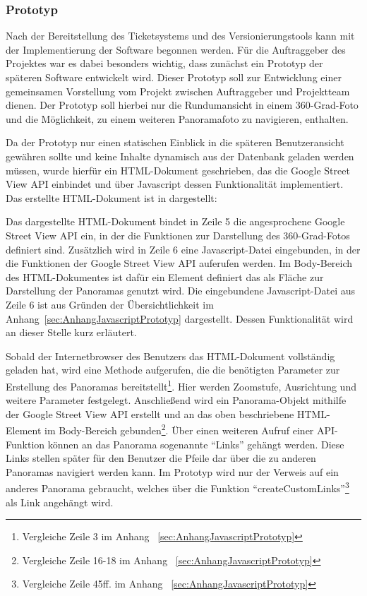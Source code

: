 \subsubsection{Prototyp}
\label{sec:Prototyp}

Nach der Bereitstellung des Ticketsystems und des Versionierungstools kann mit
der Implementierung der Software begonnen werden. Für die Auftraggeber des
Projektes war es dabei besonders wichtig, dass zunächst ein Prototyp der
späteren Software entwickelt wird. Dieser Prototyp soll zur Entwicklung einer
gemeinsamen Vorstellung vom Projekt zwischen Auftraggeber und Projektteam
dienen. Der Prototyp soll hierbei nur die Rundumansicht in einem
360-Grad-Foto und die Möglichkeit, zu einem weiteren Panoramafoto zu navigieren,
enthalten.

Da der Prototyp nur einen statischen Einblick in die späteren Benutzeransicht
gewähren sollte und keine Inhalte dynamisch aus der Datenbank geladen werden
müssen, wurde hierfür ein HTML-Dokument geschrieben, das die Google Street View
API einbindet und über Javascript dessen Funktionalität implementiert. Das
erstellte HTML-Dokument ist in  dargestellt:



Das dargestellte HTML-Dokument bindet in Zeile 5 die angesprochene Google
Street View API ein, in der die Funktionen zur Darstellung des 360-Grad-Fotos
definiert sind. Zusätzlich wird in Zeile 6 eine Javascript-Datei eingebunden,
in der die Funktionen der Google Street View API auferufen werden. Im
Body-Bereich des HTML-Dokumentes ist dafür ein Element definiert das als Fläche
zur Darstellung der Panoramas genutzt wird. Die eingebundene Javascript-Datei
aus Zeile 6 ist aus Gründen der Übersichtlichkeit
im Anhang~\ref{sec:AnhangJavascriptPrototyp} dargestellt. Dessen Funktionalität
wird an dieser Stelle kurz erläutert.

Sobald der Internetbrowser des Benutzers das HTML-Dokument vollständig geladen
hat, wird eine Methode aufgerufen, die die benötigten Parameter zur Erstellung
des Panoramas bereitstellt\footnote{Vergleiche Zeile 3 im Anhang
~\ref{sec:AnhangJavascriptPrototyp}}. Hier werden Zoomstufe, Ausrichtung und
weitere Parameter festgelegt. Anschließend wird ein Panorama-Objekt mithilfe
der Google Street View API erstellt und an das oben beschriebene HTML-Element
im Body-Bereich gebunden\footnote{Vergleiche Zeile 16-18 im Anhang
~\ref{sec:AnhangJavascriptPrototyp}}. Über einen weiteren Aufruf einer
API-Funktion können an das Panorama sogenannte "`Links"' gehängt werden. Diese
Links stellen später für den Benutzer die Pfeile dar über die zu anderen
Panoramas navigiert werden kann. Im Prototyp wird nur der Verweis auf ein
anderes Panorama gebraucht, welches über die Funktion
"`createCustomLinks"'\footnote{Vergleiche Zeile 45ff. im Anhang
~\ref{sec:AnhangJavascriptPrototyp}} als Link angehängt wird.

